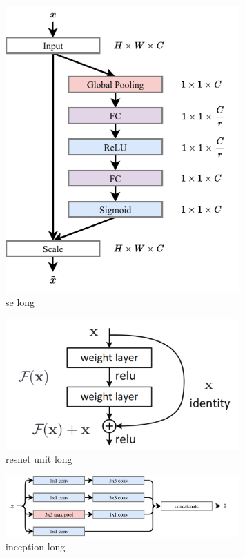 \begin{figure}
    \includegraphics[width=0.8\textwidth]{diagrams/6-cvn/se.pdf}
    \caption[se short]
    {se long}
    \label{fig:se}
\end{figure}

\begin{figure}
    \includegraphics[width=0.8\textwidth]{diagrams/6-cvn/resnet_unit.png}
    \caption[resnet unit short]
    {resnet unit long}
    \label{fig:resnet_unit}
\end{figure}

\begin{figure}
    \includegraphics[width=0.8\textwidth]{diagrams/6-cvn/inception.pdf}
    \caption[inception short]
    {inception long}
    \label{fig:se}
\end{figure}

